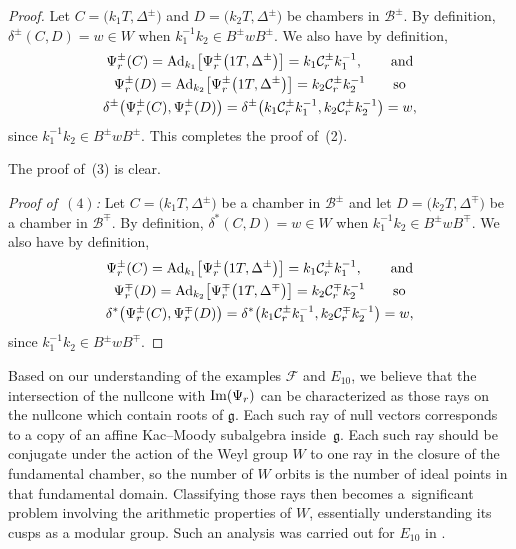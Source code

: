 \documentclass[pdftex]{sigma}
\numberwithin{equation}{section}
\def\cB{\mathcal B}
\def\cC{\mathcal C}
\def\cF{\mathcal F}
\def\fg{\mathfrak{g}}
\begin{document}
\begin{proof}
Let $C = \big(k_1T,\Delta^\pm\big)$ and $D = \big(k_2T,\Delta^\pm\big)$ be chambers in $\cB^\pm$. By definition, $\delta^\pm(C,D) = w\in W$ when $k_1^{-1} k_2\in B^\pm w B^\pm$.
We also have by definition,
\begin{gather*}
\Psi_r^\pm(C) = {\rm Ad}_{k_1}\big[\Psi_r^\pm\big(1T,\Delta^\pm\big)\big] = k_1 \cC_r^\pm k_1^{-1}, \qquad\hbox{and}\\
 \Psi_r^\pm(D) = {\rm Ad}_{k_2}\big[\Psi_r^\pm\big(1T,\Delta^\pm\big)\big] = k_2 \cC_r^\pm k_2^{-1} \qquad\hbox{so}\\
 \delta^\pm\big(\Psi_r^\pm(C),\Psi_r^\pm(D)\big) = \delta^\pm\big(k_1 \cC_r^\pm k_1^{-1}, k_2 \cC_r^\pm k_2^{-1}\big) = w,
\end{gather*}
since $k_1^{-1} k_2\in B^\pm w B^\pm$. This completes the proof of~(2).

The proof of~(3) is clear.

{\it Proof of~$(4)$:}
Let $C = \big(k_1T,\Delta^\pm\big)$ be a chamber in $\cB^\pm$ and let $D = \big(k_2T,\Delta^\mp\big)$ be a chamber in $\cB^\mp$. By definition,
$\delta^*(C,D) = w\in W$ when $k_1^{-1} k_2\in B^\pm w B^\mp$.
We also have by definition,
\begin{gather*}
\Psi_r^\pm(C) = {\rm Ad}_{k_1}\big[\Psi_r^\pm\big(1T,\Delta^\pm\big)\big] = k_1 \cC_r^\pm k_1^{-1}, \qquad\hbox{and}\\
\Psi_r^\mp(D) = {\rm Ad}_{k_2}\big[\Psi_r^\mp\big(1T,\Delta^\mp\big)\big] = k_2 \cC_r^\mp k_2^{-1} \qquad\hbox{so}\\
\delta^*\big(\Psi_r^\pm(C),\Psi_r^\mp(D)\big) = \delta^*\big(k_1 \cC_r^\pm k_1^{-1}, k_2 \cC_r^\mp k_2^{-1}\big) = w,
\end{gather*}
since $k_1^{-1} k_2\in B^\pm w B^\mp$.
\end{proof}

\begin{Remark} Based on our understanding of the examples $\cF$ and $E_{10}$, we believe that the intersection of the nullcone with ${\rm Im}(\Psi_r)$ can be characterized as those rays on the nullcone which contain roots of $\fg$. Each such ray of null vectors corresponds to a copy of an affine Kac--Moody subalgebra inside~$\fg$. Each such ray should be conjugate under the action of the Weyl group $W$ to one ray in the closure of the fundamental chamber, so the number of $W$ orbits is the number of ideal points in that fundamental domain. Classifying those rays then becomes a~significant problem involving the arithmetic properties of $W$, essentially understanding its cusps as a modular group. Such an analysis was carried out for $E_{10}$ in \cite[Lemma~5.2]{KleinschmidtPalmkvistNicolai12}.
\end{Remark}
\end{document}
